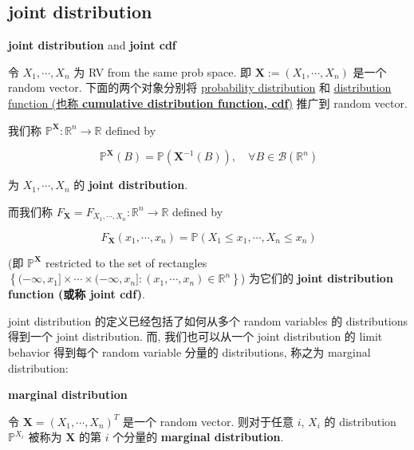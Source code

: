 \documentclass{qlnotes-export}
\begin{document}
\subsection{joint distribution}\label{joint-distribution}

\begin{definition}{\protect{}\label{kn-joint-distribution-and-joint-cdf}{\textbf{joint
distribution}} and
\protect{}\label{kn-joint-cdf}{\textbf{joint cdf}}}

令 \(X_{1},\cdots,X_{n}\) 为 RV from the same prob space. 即 \(\mathbf{X} := (X_{1},\cdots,X_{n})\) 是一个 random vector. 下面的两个对象分别将 \href{https://qiulinfan.github.io/notes/math/probability/\#kn-probability-distribution}{probability distribution} 和 \href{https://qiulinfan.github.io/notes/math/probability/\#kn-distribution-function-cumulative-distribution-function-cdf}{distribution function (也称 \textbf{cumulative distribution function, cdf})} 推广到 random vector.

我们称 \({\mathbb{P}}^{\mathbf{X}}:{\mathbb{R}}^{n}\rightarrow{\mathbb{R}}\) defined by

\[{\mathbb{P}}^{\mathbf{X}}(B) = {\mathbb{P}}(\mathbf{X}^{- 1}(B)),\quad\forall B \in \mathcal{B}({\mathbb{R}}^{n})\]

为 \(X_{1},\cdots,X_{n}\) 的 \textbf{joint distribution}.

而我们称 \(F_{\mathbf{X}} = F_{X_{1},\cdots,X_{n}}:{\mathbb{R}}^{n}\rightarrow{\mathbb{R}}\) defined by

\[F_{\mathbf{X}}(x_{1},\cdots,x_{n}) = {\mathbb{P}}(X_{1} \leq x_{1},\cdots,X_{n} \leq x_{n})\]

(即 \({\mathbb{P}}^{\mathbf{X}}\) restricted to the set of rectangles \(\left\{ {( - \infty,x_{1}\rbrack \times \cdots \times ( - \infty,x_{n}\rbrack:(x_{1},\cdots,x_{n}) \in {\mathbb{R}}^{n}} \right\}\)) 为它们的 \textbf{joint distribution function (或称 joint cdf)}.

\end{definition}

joint distribution 的定义已经包括了如何从多个 random variables 的 distributions 得到一个 joint distribution. 而, 我们也可以从一个 joint distribution 的 limit behavior 得到每个 random variable 分量的 distributions, 称之为 marginal distribution:

\begin{definition}{\protect{}\label{kn-marginal-distribution}{\textbf{marginal
distribution}}}

令 \(\mathbf{X} = (X_{1},\cdots,X_{n})^{T}\) 是一个 random vector. 则对于任意 \(i\), \(X_{i}\) 的 distribution \({\mathbb{P}}^{X_{i}}\) 被称为 \(\mathbf{X}\) 的第 \(i\) 个分量的 \textbf{marginal distribution}.

\end{definition}
\end{document}
